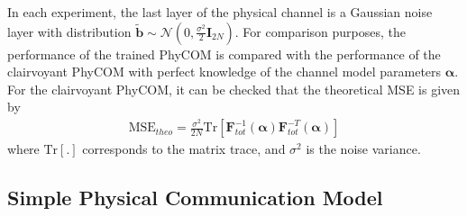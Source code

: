 \documentclass{article}
\begin{document}
In each experiment, the last layer of the physical channel is a Gaussian noise layer with distribution $\tilde{\mathbf{b}}\sim \mathcal{N}(0,\frac{\sigma^2}{2}\mathbf{I}_{2N})$. For comparison purposes, the performance of the trained PhyCOM is compared with the performance of the clairvoyant PhyCOM with perfect knowledge of the channel model parameters $\boldsymbol \alpha$. For the clairvoyant PhyCOM, it can be checked that the theoretical MSE is given by
\begin{align}
\textrm{MSE}_{theo}=\frac{\sigma^2}{2N}\textrm{Tr}\left[\mathbf{F}_{tot}^{-1}(\boldsymbol \alpha)\mathbf{F}_{tot}^{-T}(\boldsymbol \alpha)\right]
\end{align}
where $\textrm{Tr}[.]$ corresponds to the matrix trace, and $\sigma^2$ is the noise variance.

\subsection{Simple Physical Communication Model}
\end{document}
